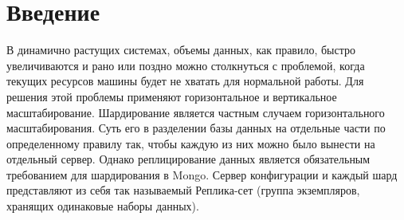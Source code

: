 \section*{\LARGE Введение}

В динамично растущих системах, объемы данных, как правило, быстро
увеличиваются и рано или поздно можно столкнуться с проблемой, когда
текущих ресурсов машины будет не хватать для нормальной работы.
Для решения этой проблемы применяют горизонтальное и вертикальное
масштабирование. Шардирование является частным случаем горизонтального
масштабирования. Суть его в разделении базы данных на отдельные части по
определенному правилу так, чтобы каждую из них можно было вынести на
отдельный сервер. Однако реплицирование данных является обязательным
требованием для шардирования в Mongo. Сервер конфигурации и каждый шард
представляют из себя так называемый Реплика-сет (группа экземпляров,
хранящих одинаковые наборы данных).